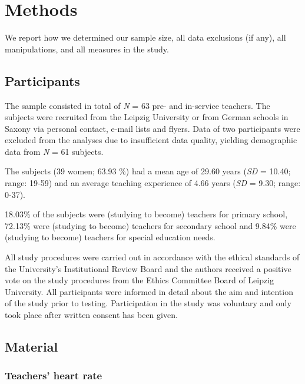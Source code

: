 \documentclass[
  man]{apa6}
\begin{document}
\hypertarget{methods}{%
\section{Methods}\label{methods}}

We report how we determined our sample size, all data exclusions (if any), all manipulations, and all measures in the study.

\hypertarget{participants}{%
\subsection{Participants}\label{participants}}

The sample consisted in total of \emph{N} = 63 pre- and in-service teachers. The subjects were recruited from the Leipzig University or from German schools in Saxony via personal contact, e-mail lists and flyers. Data of two participants were excluded from the analyses due to insufficient data quality, yielding demographic data from \emph{N} = 61 subjects.

The subjects (39 women; 63.93 \%) had a mean age of 29.60 years (\emph{SD} = 10.40; range: 19-59) and an average teaching experience of 4.66 years (\emph{SD} = 9.30; range: 0-37).

18.03\% of the subjects were (studying to become) teachers for primary school, 72.13\% were (studying to become) teachers for secondary school and 9.84\% were (studying to become) teachers for special education needs.

All study procedures were carried out in accordance with the ethical standards of the University's Institutional Review Board and the authors received a positive vote on the study procedures from the Ethics Committee Board of Leipzig University. All participants were informed in detail about the aim and intention of the study prior to testing. Participation in the study was voluntary and only took place after written consent has been given.

\hypertarget{material}{%
\subsection{Material}\label{material}}

\hypertarget{teachers-heart-rate}{%
\subsubsection{Teachers' heart rate}\label{teachers-heart-rate}}
\end{document}
